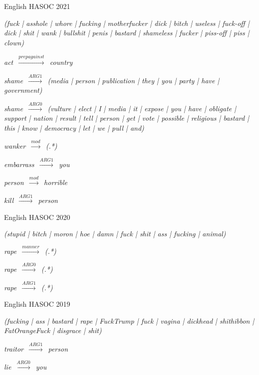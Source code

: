 \documentclass[sigconf,anonymous]{acmart}
\begin{document}
\begin{figure*}

English HASOC 2021

\begin{description}
	\small
	\item \textit{(fuck | asshole | whore | fucking | motherfucker | dick | bitch |
		useless | fuck-off | dick | shit | wank | bullshit | penis |
		bastard | shameless | fucker | piss-off | piss | clown)}
	\item \textit{act~$\xrightarrow{prepagainst}$~country}
	\item \textit{shame~$\xrightarrow{ARG1}$~(media | person | publication
		| they | you | party | have | government)}
	\item \textit{shame~$\xrightarrow{ARG0}$~(vulture | elect | I | media |
		it | expose | you | have | obligate | support | nation | result |
		tell | person | get | vote | possible | religious | bastard | this
		| know | democracy | let | we | pull | and)}
	\item \textit{wanker~$\xrightarrow{mod}$~(.*)}
	\item \textit{embarrass~$\xrightarrow{ARG1}$~you}
	\item \textit{person~$\xrightarrow{mod}$~horrible}
	\item \textit{kill~$\xrightarrow{ARG1}$~person}
\end{description}
\bigskip

English HASOC 2020

\begin{description}
	\small
	\item \textit{(stupid | bitch | moron | hoe | damn | fuck | shit |
		ass | fucking | animal)}
	\item \textit{rape~$\xrightarrow{manner}$~(.*)}
	\item \textit{rape~$\xrightarrow{ARG0}$~(.*)}
	\item \textit{rape~$\xrightarrow{ARG1}$~(.*)}
\end{description}
\bigskip

English HASOC 2019

\begin{description}
	\small
	\item \textit{(fucking | ass | bastard | rape | FuckTrump | fuck | vagina |
		dickhead | shithibbon | FatOrangeFuck | disgrace | shit)}
	\item \textit{traitor~$\xrightarrow{ARG1}$~person}
	\item \textit{lie~$\xrightarrow{ARG0}$~you}
\end{description}
\bigskip


\end{figure*}
\end{document}

